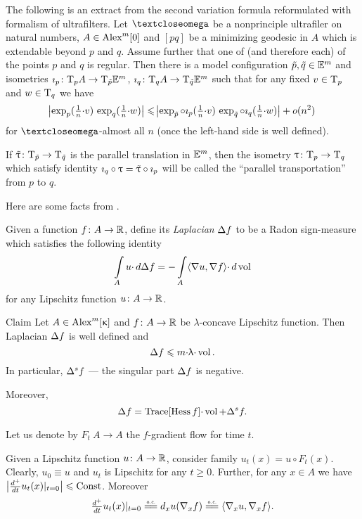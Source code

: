\documentclass[oneside,a4paper]{article}
\begin{document}
The following is an extract from the second variation formula \cite[1.1B]{petrunin:parallel}
reformulated with formalism of ultrafilters.
Let $\o$ be a nonprinciple ultrafiler on natural numbers,
$A\in\CBB{m}{0}$
and $[p q]$ be a minimizing geodesic in $A$ which is extendable beyond $p$ and $q$.
Assume further that one of (and therefore each) of the  points $p$ and $q$ is regular.
Then there is a model configuration $\~p,\~q\in\EE^m$ and isometries $\imath_p\:\T_p A\to\T_{\~p}\EE^m$,
$\imath_q\:\T_q A\to\T_{\~q}\EE^m$ 
such that for any fixed $v\in\T_p$ and $w\in\T_q$ we have
$$
\l|\exp_p(\tfrac 1 n{\cdot} v)\,\exp_q(\tfrac 1 n{\cdot} w)\r|
\le
\l|\exp_{\~p}\circ\imath_p(\tfrac 1 n{\cdot} v)\,\exp_{\~q}\circ\imath_q(\tfrac1 n{\cdot} w)\r|+o(n^2)$$
for $\o$-almost all $n$ (once the left-hand  side is well defined).

{\sloppy If $\~\tau\:\T_{\~p}\to\T_{\~q}$ is the parallel translation in $\EE^m$, then the isometry  \hbox{$\tau\:\T_p\to\T_q$} which satisfy identity $\imath_q\circ\tau=\~\tau\circ\imath_p$ will be called the  ``parallel transportation'' from $p$ to $q$.

}
Here are some facts from \cite{petrunin:HarmFun}.

Given a function $f\:A\to\RR$, define its \emph{Laplacian} $\Lap f$ to be a Radon sign-measure which satisfies the following identity
$$\int\limits_Au{\cdot}\,d\Lap f
=
-\int\limits_A\<\nabla u,\nabla f\>{\cdot}\,d\vol$$
for any Lipschitz function $u\:A\to\RR$.

\begin{thm}{Claim}\label{lap}
Let $A\in\CBB{m}{\kappa}$ and $f\:A\to \RR$ be $\lambda$-concave Lipschitz function.
Then Laplacian $\Lap f$ is well defined and
$$\Lap f\le m{\cdot}\lambda{\cdot}\vol.$$
In particular, $\Lap^s f$ --- the singular part $\Lap f$ is negative.

Moreover, 
$$\Lap f =\Trace[\Hess f]{\cdot}\vol+\Lap^s f.$$

\end{thm}

Let us denote by $F_t\:A\to A$ the $f$-gradient flow for time $t$.

Given a Lipschitz function $u\:A\to\RR$, 
consider family $u_t(x)=u\circ F_t(x)$.
Clearly, $u_0\equiv u$ and $u_t$ is Lipschitz for any $t\ge0$.
Further, for any $x\in A$ we have $\bigl|{\tfrac{d^+}{d t}}u_t(x)|_{t=0}\bigr|\le\Const$.
Moreover 
$$\tfrac{d^+}{d t}u_t(x)|_{t=0}\ae d_x u(\nabla_x f)\ae\<\nabla_x u,\nabla_x f\>.$$
\end{document}

